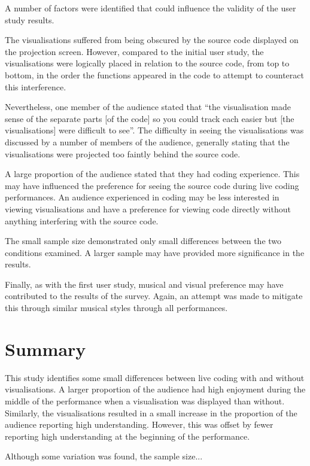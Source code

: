 A number of factors were identified that could influence the validity of the user study results.

The visualisations suffered from being obscured by the source code displayed on the projection screen. However, compared to the initial user study, the visualisations were logically placed in relation to the source code, from top to bottom, in the order the functions appeared in the code to attempt to counteract this interference.

Nevertheless, one member of the audience stated that ``the visualisation made sense of the separate parts [of the code] so you could track each easier but [the visualisations] were difficult to see''. The difficulty in seeing the visualisations was discussed by a number of members of the audience, generally stating that the visualisations were projected too faintly behind the source code.

A large proportion of the audience stated that they had coding experience. This may have influenced the preference for seeing the source code during live coding performances. An audience experienced in coding may be less interested in viewing visualisations and have a preference for viewing code directly without anything interfering with the source code.

The small sample size demonstrated only small differences between the two conditions examined. A larger sample may have provided more significance in the results. \more

Finally, as with the first user study, musical and visual preference may have contributed to the results of the survey. Again, an attempt was made to mitigate this through similar musical styles through all performances.

\section{Summary}

This study identifies some small differences between live coding with and without visualisations. A larger proportion of the audience had high enjoyment during the middle of the performance when a visualisation was displayed than without. Similarly, the visualisations resulted in a small increase in the proportion of the audience reporting high understanding. However, this was offset by fewer reporting high understanding at the beginning of the performance. 

Although some variation was found, the sample size... \more









